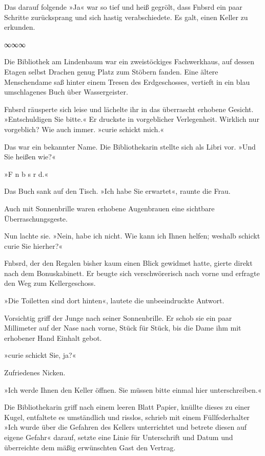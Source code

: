Das darauf folgende »Ja« war so tief und heiß gegrölt, dass Fnbsrd ein paar Schritte zurücksprang und sich hastig verabschiedete. Es galt, einen Keller zu erkunden.

\begin{center}
∞∞∞
\end{center}

Die Bibliothek am Lindenbaum war ein zweistöckiges Fachwerkhaus, auf dessen Etagen selbst Drachen genug Platz zum Stöbern fanden. Eine ältere Menschendame saß hinter einem Tresen des Erdgeschosses, vertieft in ein blau umschlagenes Buch über Wassergeister.

Fnbsrd räusperte sich leise und lächelte ihr in das überrascht erhobene Gesicht. »Entschuldigen Sie bitte.« Er druckste in vorgeblicher Verlegenheit. Wirklich nur vorgeblich? Wie auch immer. »curie schickt mich.«

Das war ein bekannter Name. Die Bibliothekarin stellte sich als Libri vor. »Und Sie heißen wie?«

»F n b s r d.«

Das Buch sank auf den Tisch. »Ich habe Sie erwartet«, raunte die Frau.

Auch mit Sonnenbrille waren erhobene Augenbrauen eine sichtbare Überraschungsgeste.

Nun lachte sie. »Nein, habe ich nicht. Wie kann ich Ihnen helfen; weshalb schickt curie Sie hierher?«

Fnbsrd, der den Regalen bisher kaum einen Blick gewidmet hatte, gierte direkt nach dem Bonuskabinett. Er beugte sich verschwörerisch nach vorne und erfragte den Weg zum Kellergeschoss.

»Die Toiletten sind dort hinten«, lautete die unbeeindruckte Antwort.

Vorsichtig griff der Junge nach seiner Sonnenbrille. Er schob sie ein paar Millimeter auf der Nase nach vorne, Stück für Stück, bis die Dame ihm mit erhobener Hand Einhalt gebot.

»curie schickt Sie, ja?«

Zufriedenes Nicken.

»Ich werde Ihnen den Keller öffnen. Sie müssen bitte einmal hier unterschreiben.«

Die Bibliothekarin griff nach einem leeren Blatt Papier, knüllte dieses zu einer Kugel, entfaltete es umständlich und risslos, schrieb mit einem Füllfederhalter »Ich wurde über die Gefahren des Kellers unterrichtet und betrete diesen auf eigene Gefahr« darauf, setzte eine Linie für Unterschrift und Datum und überreichte dem mäßig erwünschten Gast den Vertrag.

